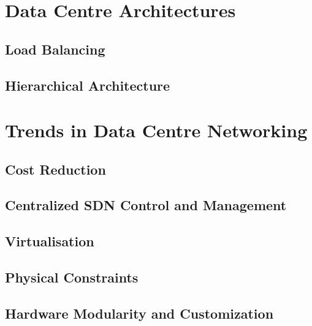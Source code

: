 \documentclass[12pt letter]{report}
\begin{document}
\section{Data Centre Architectures}

\subsection{Load Balancing}

\subsection{Hierarchical Architecture}

\section{Trends in Data Centre Networking}

\subsection{Cost Reduction}

\subsection{Centralized SDN Control and Management}

\subsection{Virtualisation}

\subsection{Physical Constraints}

\subsection{Hardware Modularity and Customization}
\end{document}
